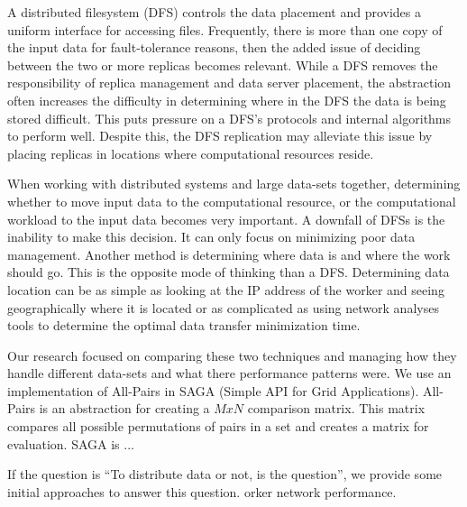 \documentclass{rspublic}
\begin{document}
A distributed filesystem (DFS) controls the data placement and provides
a uniform interface for accessing files.  Frequently, there is more than
one copy of the input data for fault-tolerance reasons, then the added
issue of deciding between the two or more replicas becomes relevant.
While a DFS removes the responsibility of replica management and data
server placement, the abstraction often increases the difficulty in
determining where in the DFS the data is being stored difficult.  This
puts pressure on a DFS's protocols and internal algorithms to perform
well.  Despite this, the DFS replication may alleviate this issue by
placing replicas in locations where computational resources reside.

When working with distributed systems and large data-sets together,
determining whether to move input data to the computational resource, or
the computational workload to the input data becomes very important.  A
downfall of DFSs is the inability to make this decision.  It can only
focus on minimizing poor data management.  Another method is determining
where data is and where the work should go.  This is the opposite mode
of thinking than a DFS.  Determining data location can be as simple as
looking at the IP address of the worker and seeing geographically where
it is located or as complicated as using network analyses tools to
determine the optimal data transfer minimization time.

Our research focused on comparing these two techniques and managing how
they handle different data-sets and what there performance patterns
were.  We use an implementation of All-Pairs in SAGA (Simple API for
Grid Applications).  All-Pairs is an abstraction for creating a $MxN$
comparison matrix.  This matrix compares all possible permutations of
pairs in a set and creates a matrix for evaluation.  SAGA is ...

If the question is ``To distribute data or not, is the question'', we
provide some initial approaches to answer this question.  orker network
performance.


\end{document}
